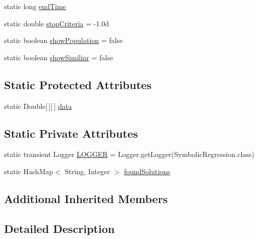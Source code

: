 \begin{DoxyCompactItemize}
static long \hyperlink{classexamples_1_1gp_1_1symbolic_regression_1_1_symbolic_regression_a55a0a74996362e5641e0c0a2a237aa44}{end\-Time}
\item 
static double \hyperlink{classexamples_1_1gp_1_1symbolic_regression_1_1_symbolic_regression_a88585957d820cb0d8606b8975d3da984}{stop\-Criteria} = -\/1.\-0d
\item 
static boolean \hyperlink{classexamples_1_1gp_1_1symbolic_regression_1_1_symbolic_regression_a3fe3b5aec221fd8f8e8a45d5d525367b}{show\-Population} = false
\item 
static boolean \hyperlink{classexamples_1_1gp_1_1symbolic_regression_1_1_symbolic_regression_aff693574d91b44b50fcfbacbb8f6714a}{show\-Similiar} = false
\end{DoxyCompactItemize}
\subsection*{Static Protected Attributes}
\begin{DoxyCompactItemize}
\item 
static Double\mbox{[}$\,$\mbox{]}\mbox{[}$\,$\mbox{]} \hyperlink{classexamples_1_1gp_1_1symbolic_regression_1_1_symbolic_regression_aa588c62a94fe721a95da78977de37d62}{data}
\end{DoxyCompactItemize}
\subsection*{Static Private Attributes}
\begin{DoxyCompactItemize}
\item 
static transient Logger \hyperlink{classexamples_1_1gp_1_1symbolic_regression_1_1_symbolic_regression_ab88310d97fc6498dd4e71bf3508f73fd}{L\-O\-G\-G\-E\-R} = Logger.\-get\-Logger(Symbolic\-Regression.\-class)
\item 
static Hash\-Map$<$ String, Integer $>$ \hyperlink{classexamples_1_1gp_1_1symbolic_regression_1_1_symbolic_regression_ae642324f14a8d80a8856af126d3dbc91}{found\-Solutions}
\end{DoxyCompactItemize}
\subsection*{Additional Inherited Members}


\subsection{Detailed Description}


